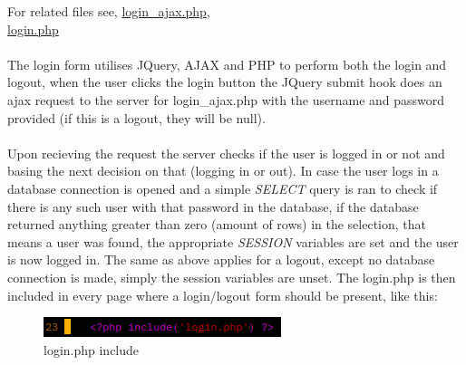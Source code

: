 \documentclass[a4paper]{scrartcl}
\begin{document}
\noindent
For related files see,
\href{https://github.com/linus-dev/KTH-Projects/blob/master/ID1354/2/login_ajax.php}{login\_ajax.php},\\
\href{https://github.com/linus-dev/KTH-Projects/blob/master/ID1354/2/login.php}{login.php}
\\
\\
The login form utilises JQuery, AJAX and PHP to perform both the login and logout,
when the user clicks the login button the JQuery submit hook does an ajax request
to the server for login\_ajax.php with the username and password provided (if this is a logout, they will be null).
\\\\
Upon recieving the request the server checks if the user is logged in or not and basing the next decision
on that (logging in or out). In case the user logs in a database connection is opened and
a simple \textit{SELECT} query is ran to check if there is any such user with that password in the database,
if the database returned anything greater than zero (amount of rows) in the selection, that means a user was found,
the appropriate \textit{SESSION} variables are set and the user is now logged in.
The same as above applies for a logout, except no database connection is made, simply the 
session variables are unset.
The login.php is then included in every page where a login/logout form should be present, like this:

\begin{figure}[H]
  \begin{center}
    \includegraphics[scale=1]{images/login_include.png}
    \caption{login.php include}
  \end{center}
\end{figure}
\end{document}
